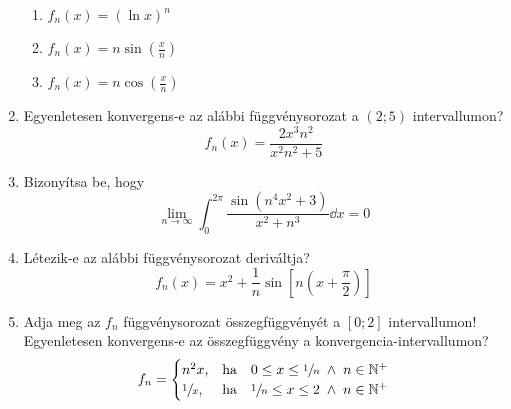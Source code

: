 \documentclass[a4paper, 12pt]{scrartcl}
\begin{document}
\begin{enumerate}
\begin{multicols}{2}
\begin{enumerate}
            \item $
                    f_n(x) = (\ln x)^n
                  $

            \item $\displaystyle
                    f_n(x) = n\sin\left(\frac{x}{n}\right)
                  $

            \item $\displaystyle
                    f_n(x) = n\cos\left(\frac{x}{n}\right)
                  $
          \end{enumerate}
        \end{multicols}

  \item Egyenletesen konvergens-e az alábbi függvénysorozat a $(2; 5)$
        intervallumon?
        $$
          f_n(x) = \frac{2x^3n^2}{x^2n^2+5}
        $$

  \item Bizonyítsa be, hogy
        $$
          \lim_{n \to \infty} \int_{0}^{2\pi} \frac{\sin(n^4x^2+3)}{x^2+n^3} \dd x = 0
        $$

  \item Létezik-e az alábbi függvénysorozat deriváltja?
        $$
          f_n(x) = x^2 + \frac{1}{n}\sin\left[n\left(x+\frac{\pi}{2}\right)\right]
        $$

  \item Adja meg az $f_n$ függvénysorozat összegfüggvényét a $[0; 2]$
        intervallumon! Egyenletesen konvergens-e az összegfüggvény a
        konvergencia-intervallumon?
        $$
          f_n = \begin{cases}
            n^2 x \text,        & \text{ha} \quad 0 \leq x \leq \sfrac{1}{n} \; \land \; n \in \mathbb N^+ \\
            \sfrac{1}{x} \text, & \text{ha} \quad \sfrac{1}{n} \leq x \leq 2 \; \land \; n \in \mathbb N^+
          \end{cases}
        $$
\end{enumerate}
\end{document}
